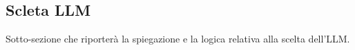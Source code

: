 \subsection{Scleta LLM}

Sotto-sezione che riporterà la spiegazione e la logica relativa alla scelta dell'LLM.